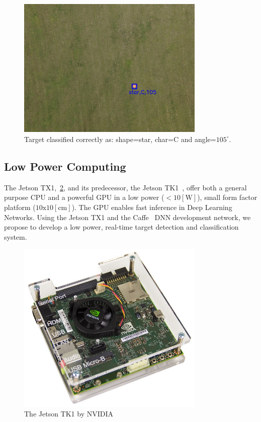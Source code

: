 \documentclass{article} %
\begin{document}
\begin{figure}[h]
	\centering
	\includegraphics[width=0.8\textwidth]{true_positive_correct_letter2}
	\caption{Target classified correctly as: shape=star, char=C and angle=$105^\circ$.}
	\label{fig:true_positive2}
\end{figure}


\subsection{Low Power Computing}
\label{sec:low_power_computing}

The Jetson TX1,~\cref{fig:jetson}, and its predecessor, the Jetson
TK1~\cite{jetsontk}, offer both a general purpose CPU and a powerful GPU in a
low power ($<10[\textrm{W}]$), small form factor platform
($10\textrm{x}10[\textrm{cm}]$). The GPU enables fast inference in Deep
Learning Networks. Using the Jetson TX1 and the Caffe~\cite{jia2014caffe} DNN
development network, we propose to  develop a low power, real-time target detection and classification
system.

\begin{figure}[h]
	\centering
	\includegraphics[width=0.8\textwidth]{jetson}
	\caption{The Jetson TK1 by NVIDIA}
	\label{fig:jetson}
\end{figure}
\end{document}
